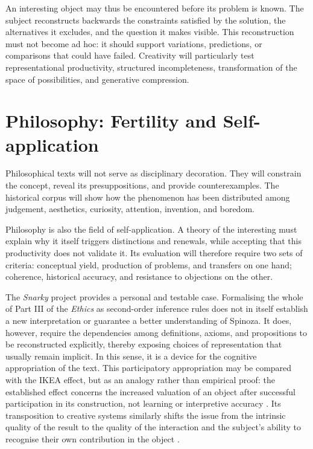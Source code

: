 \documentclass[11pt,a4paper]{article}
\begin{document}
An interesting object may thus be encountered before its problem is known. The
subject reconstructs backwards the constraints satisfied by the solution, the
alternatives it excludes, and the question it makes visible. This reconstruction
must not become ad hoc: it should support variations, predictions, or
comparisons that could have failed. Creativity will particularly test
representational productivity, structured incompleteness, transformation of the
space of possibilities, and generative compression.

\section{Philosophy: Fertility and Self-application}

Philosophical texts will not serve as disciplinary decoration. They will
constrain the concept, reveal its presuppositions, and provide counterexamples.
The historical corpus will show how the phenomenon has been distributed among
judgement, aesthetics, curiosity, attention, invention, and boredom.

Philosophy is also the field of self-application. A theory of the interesting
must explain why it itself triggers distinctions and renewals, while accepting
that this productivity does not validate it. Its evaluation will therefore
require two sets of criteria: conceptual yield, production of problems, and
transfers on one hand; coherence, historical accuracy, and resistance to
objections on the other.

The \emph{Snarky} project provides a personal and testable case. Formalising the
whole of Part III of the \emph{Ethics} as second-order inference rules does not
in itself establish a new interpretation or guarantee a better understanding of
Spinoza. It does, however, require the dependencies among definitions, axioms,
and propositions to be reconstructed explicitly, thereby exposing choices of
representation that usually remain implicit. In this sense, it is a device for
the cognitive appropriation of the text. This participatory appropriation may be
compared with the IKEA effect, but as an analogy rather than empirical proof:
the established effect concerns the increased valuation of an object after
successful participation in its construction, not learning or interpretive
accuracy \parencite{norton2012ikea}. Its transposition to creative systems
similarly shifts the issue from the intrinsic quality of the result to the
quality of the interaction and the subject's ability to recognise their own
contribution in the object \parencite[152--153]{pachet2026generation}.
\end{document}
